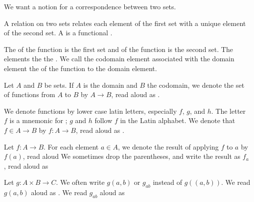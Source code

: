 
\sbasic




\sstart



We want a notion for a correspondence
between two sets.


A  relation
on two sets relates each element of the
first set with a unique element of the
second set.
A  is a
functional .

The  of the function is
the first set and 
of the function is the second set.
The 
 elements
 the
 
the .
We call the codomain element associated
with the domain element the
 of
the function to the domain element.


Let $A$ and $B$ be sets.
If $A$ is the domain and $B$ the codomain,
we denote the set of functions from $A$ to
$B$ by $A \to B$, read aloud as .

We denote functions by lower case latin letters,
especially $f$, $g$, and $h$.
The letter $f$ is a mnemonic for
;
$g$ and $h$ follow $f$ in the Latin alphabet.
We denote that $f \in A \to B$ by
$f: A \to B$, read aloud as
.

Let $f: A \to B$.
For each element $a \in A$, we denote the
result of applying
$f$ to $a$ by $f(a)$, read aloud
We sometimes drop the parentheses, and write
the result as $f_a$, read aloud as

Let $g: A \times B \to C$.
We often write $g(a,b)$ or $g_{ab}$
instead of $g((a,b))$.
We read $g(a, b)$ aloud as
.
We read $g_{ab}$ aloud as

\strats
